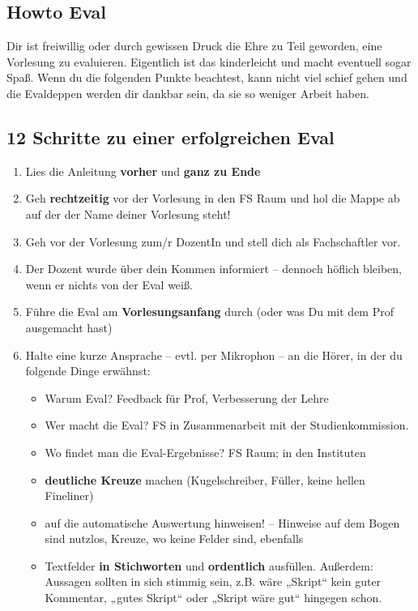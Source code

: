 \documentclass[a4paper,10pt]{article}
\begin{document}
\subsection*{Howto Eval}
Dir ist freiwillig oder durch gewissen Druck die Ehre zu Teil
geworden, eine Vorlesung zu evaluieren. Eigentlich ist das
kinderleicht und macht eventuell sogar Spaß. Wenn du die folgenden
Punkte beachtest, kann nicht viel schief gehen und die Evaldeppen
werden dir dankbar sein, da sie so weniger Arbeit haben.

\subsection*{12 Schritte zu einer erfolgreichen Eval}
\begin{enumerate}
\item Lies die Anleitung \textbf{vorher} und \textbf{ganz zu Ende}
\item Geh \textbf{rechtzeitig} vor der Vorlesung in den FS Raum und hol die
  Mappe ab auf der der Name deiner Vorlesung steht!
\item Geh vor der Vorlesung zum/r DozentIn und stell dich als
  Fachschaftler vor.
\item Der Dozent wurde über dein Kommen informiert -- dennoch höflich
  bleiben, wenn er nichts von der Eval weiß.
\item Führe die Eval am \textbf{Vorlesungsanfang} durch (oder was Du mit dem Prof ausgemacht hast)
\item Halte eine kurze Ansprache -- evtl. per Mikrophon -- an die
  Hörer, in der du folgende Dinge erwähnst:
    \begin{itemize}
    \item Warum Eval? Feedback für Prof, Verbesserung der Lehre
    \item Wer macht die Eval? FS in Zusammenarbeit mit der
          Studienkommission.
    \item Wo findet man die Eval-Ergebnisse? FS Raum; in den
          Instituten
    \item \textbf{deutliche Kreuze} machen (Kugelschreiber, Füller, keine
          hellen Fineliner)
    \item auf die automatische Auswertung hinweisen! -- Hinweise
          auf dem Bogen sind nutzlos, Kreuze, wo keine Felder sind,
          ebenfalls
    \item Textfelder \textbf{in Stichworten} und \textbf{ordentlich} ausfüllen. Außerdem: Aussagen sollten in sich stimmig sein, z.B. wäre „Skript“ kein guter Kommentar, „gutes Skript“ oder „Skript wäre gut“ hingegen schon.

\end{itemize}
\end{enumerate}
\end{document}

